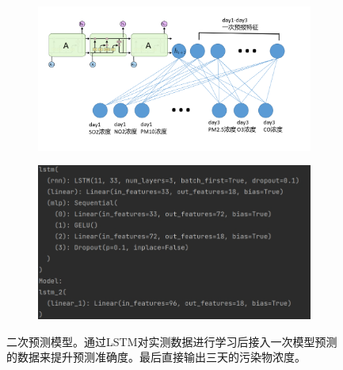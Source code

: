 \documentclass[bwprint]{gmcmthesis}
\numberwithin{figure}{section}
\begin{document}
\begin{figure}
	\centering
	\begin{subfigure}[ht]{.4\textwidth}
		\centering
		\includegraphics[width=\textwidth]{model.jpg}
	\end{subfigure}
	\begin{subfigure}[ht]{.4\textwidth}
		\includegraphics[width=\textwidth]{figures/model_2.jpg}
	\end{subfigure}
	\caption{二次预测模型。通过LSTM对实测数据进行学习后接入一次模型预测的数据来提升预测准确度。最后直接输出三天的污染物浓度。}
	\label{model}
\end{figure}
\end{document}
